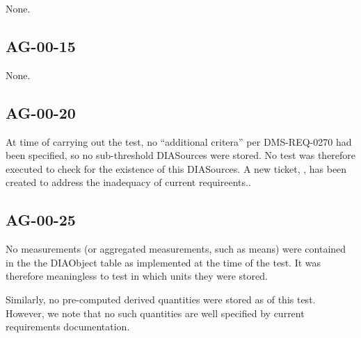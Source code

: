 \documentclass[DM,lsstdraft,STR,toc]{lsstdoc}
\begin{document}
None.

\subsection{AG-00-15}
\label{sect:deviation-ag-00-15}

None.

\subsection{AG-00-20}
\label{sect:deviation-ag-00-20}

At time of carrying out the test, no ``additional critera'' per DMS-REQ-0270 had been specified, so no sub-threshold DIASources were stored.
No test was therefore executed to check for the existence of this DIASources.
A new ticket, , has been created to address the inadequacy of current requireents..

\subsection{AG-00-25}
\label{sect:deviation-ag-00-25}

No measurements (or aggregated measurements, such as means) were contained in
the the DIAObject table as implemented at the time of the test. It was
therefore meaningless to test in which units they were stored.

Similarly, no pre-computed derived quantities were stored as of this test.
However, we note that no such quantities are well specified by current requirements documentation.
\end{document}
